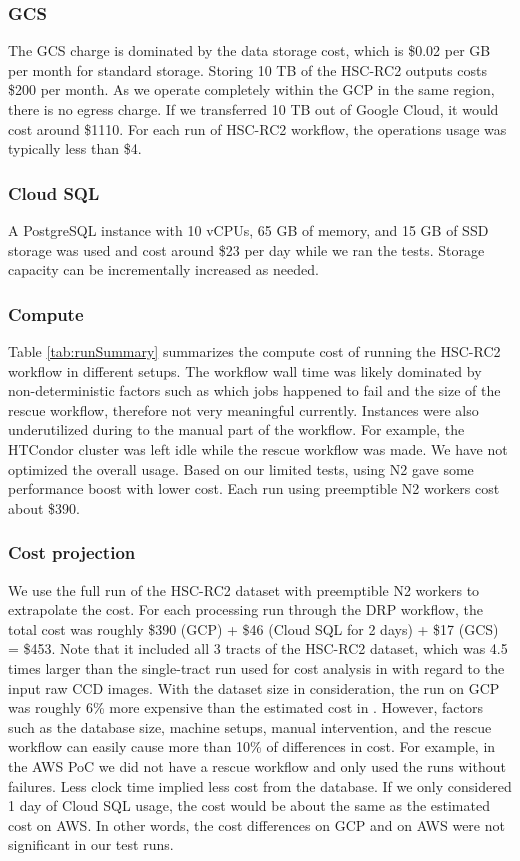 \subsubsection{GCS}
The GCS charge is dominated by the data storage cost, which is \$0.02 per GB per month for standard storage.
Storing 10 TB of the HSC-RC2 outputs costs \$200 per month.
As we operate completely within the GCP in the same region, there is no egress charge.
If we transferred 10 TB out of Google Cloud, it would cost around \$1110.
For each run of HSC-RC2 workflow, the operations usage was typically less than \$4.

\subsubsection{Cloud SQL}
A PostgreSQL instance with 10 vCPUs, 65 GB of memory, and 15 GB of SSD storage was used and cost around \$23 per day while we ran the tests.
Storage capacity can be incrementally increased as needed.

\subsubsection{Compute}
Table \ref{tab:runSummary} summarizes the compute cost of running the HSC-RC2 workflow in different setups.
The workflow wall time was likely dominated by non-deterministic factors such as which jobs happened to fail and the size of the rescue workflow, therefore not very meaningful currently.
Instances were also underutilized during to the manual part of the workflow.
For example, the HTCondor cluster was left idle while the rescue workflow was made.
We have not optimized the overall usage.
Based on our limited tests, using N2 gave some performance boost with lower cost.
Each run using preemptible N2 workers cost about \$390.

\subsubsection{Cost projection}
We use the full run of the HSC-RC2 dataset with preemptible N2 workers to extrapolate the cost.
For each processing run through the DRP workflow, the total cost was roughly \$390 (GCP) + \$46 (Cloud SQL for 2 days) + \$17 (GCS) = \$453.
Note that it included all 3 tracts of the HSC-RC2 dataset, which was 4.5 times larger than the single-tract run used for cost analysis in  with regard to the input raw CCD images.
With the dataset size in consideration, the run on GCP was roughly 6\% more expensive than the estimated cost in .
However, factors such as the database size, machine setups, manual intervention, and the rescue workflow can easily cause more than 10\% of differences in cost.
For example, in the AWS PoC we did not have a rescue workflow and only used the runs without failures.
Less clock time implied less cost from the database.
If we only considered 1 day of Cloud SQL usage, the cost would be about the same as the estimated cost on AWS.
In other words, the cost differences on GCP and on AWS were not significant in our test runs.

